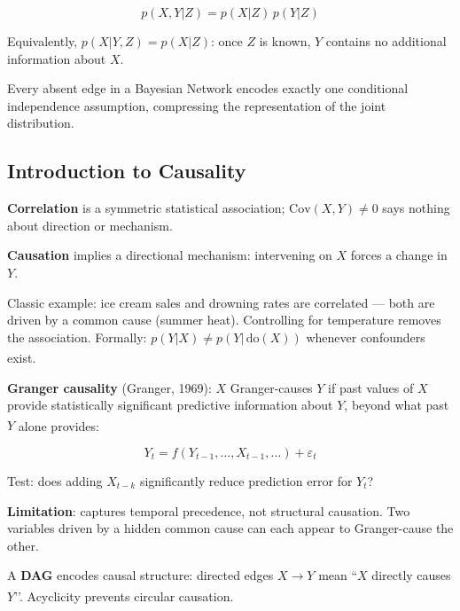 \begin{tcbitemize}[ skin=sectionraster ]
    \begin{equation}
        p(X, Y | Z) = p(X|Z)\,p(Y|Z)
    \end{equation}

    Equivalently, $p(X|Y,Z) = p(X|Z)$: once $Z$ is known, $Y$ contains no
    additional information about $X$.

    Every absent edge in a Bayesian Network encodes exactly one conditional
    independence assumption, compressing the representation of the joint
    distribution.

    \end{tcbitemize}

    \subsection{Introduction to Causality}
    \begin{tcbitemize}[ skin=sectionraster ]

    \tcbitem[title={Correlation vs Causation}, raster multicolumn=3]
    \textbf{Correlation} is a symmetric statistical association;
    $\mathrm{Cov}(X,Y) \neq 0$ says nothing about direction or mechanism.

    \textbf{Causation} implies a directional mechanism: intervening on $X$
    forces a change in $Y$.

    Classic example: ice cream sales and drowning rates are correlated ---
    both are driven by a common cause (summer heat). Controlling for
    temperature removes the association. Formally: $p(Y|X) \neq p(Y|\,\mathrm{do}(X))$
    whenever confounders
    exist.\textsuperscript{\cite[][Ch.~1]{pearlBookWhyNew2018}}

    \tcbitem[title=Granger Causality, raster multicolumn=3]
    \textbf{Granger causality} (Granger, 1969): $X$ Granger-causes $Y$ if past
    values of $X$ provide statistically significant predictive information
    about $Y$, beyond what past $Y$ alone
    provides:\textsuperscript{\cite[][Ch.~2]{nessCausalAI2025}}

    \[ Y_t = f(Y_{t-1}, \ldots, X_{t-1}, \ldots) + \varepsilon_t \]

    Test: does adding $X_{t-k}$ significantly reduce prediction error for $Y_t$?

    \textbf{Limitation}: captures temporal precedence, not structural
    causation. Two variables driven by a hidden common cause can each appear
    to Granger-cause the other.

    \tcbitem[title={Directed Acyclic Graphs (DAGs)}, raster multicolumn=3]
    A \textbf{DAG} encodes causal structure: directed edges $X \to Y$ mean
    ``$X$ directly causes $Y$’’. Acyclicity prevents circular
    causation.\textsuperscript{\cite[][pp.~25--27]{barberBayesianReasoningMachine2012}}


\end{tcbitemize}
